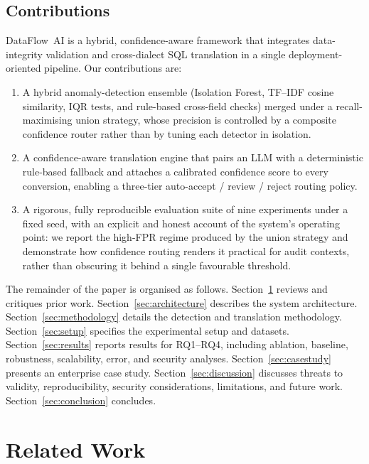 \documentclass{ieeeaccess}
\begin{document}
\subsection{Contributions}
DataFlow~AI is a hybrid, confidence-aware framework that integrates data-integrity validation and cross-dialect SQL
translation in a single deployment-oriented pipeline. Our contributions are:

\begin{enumerate}
\item A hybrid anomaly-detection ensemble (Isolation Forest, TF--IDF cosine similarity, IQR tests, and rule-based
cross-field checks) merged under a recall-maximising union strategy, whose precision is controlled by a composite
confidence router rather than by tuning each detector in isolation.
\item A confidence-aware translation engine that pairs an LLM with a deterministic rule-based fallback and attaches a
calibrated confidence score to every conversion, enabling a three-tier auto-accept / review / reject routing policy.
\item A rigorous, fully reproducible evaluation suite of nine experiments under a fixed seed, with an explicit and honest
account of the system's operating point: we report the high-FPR regime produced by the union strategy and demonstrate how
confidence routing renders it practical for audit contexts, rather than obscuring it behind a single favourable threshold.
\end{enumerate}

The remainder of the paper is organised as follows. Section~\ref{sec:related_work} reviews and critiques prior work.
Section~\ref{sec:architecture} describes the system architecture. Section~\ref{sec:methodology} details the detection and
translation methodology. Section~\ref{sec:setup} specifies the experimental setup and datasets.
Section~\ref{sec:results} reports results for RQ1--RQ4, including ablation, baseline, robustness, scalability, error, and
security analyses. Section~\ref{sec:casestudy} presents an enterprise case study. Section~\ref{sec:discussion} discusses
threats to validity, reproducibility, security considerations, limitations, and future work.
Section~\ref{sec:conclusion} concludes.

\section{Related Work}
\label{sec:related_work}
\end{document}

